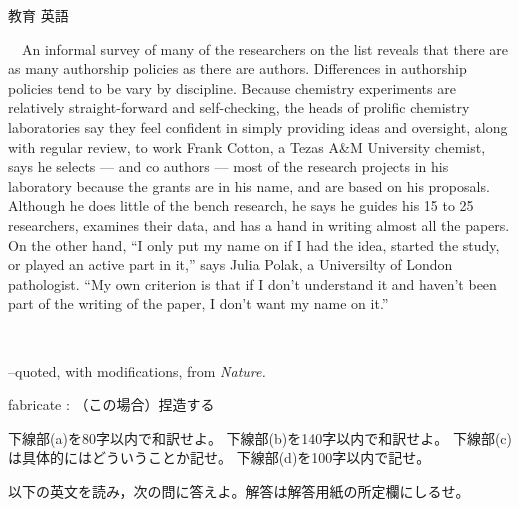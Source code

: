 \documentclass[fleqn]{jbook}
\begin{document}
\begin{question}{教育 英語}{}
\begin{subquestions}
   　An informal survey of many of the researchers on the list reveals
   that there are as many authorship policies as there are
   authors. Differences in authorship policies tend to be vary by
   discipline. Because chemistry experiments are relatively
   straight-forward and self-checking, the heads of prolific chemistry
   laboratories say they feel confident in simply providing ideas and
   oversight, along with regular review, to work
    Frank Cotton, a
   Tezas A\&M University chemist, says he selects --- and co
   authors --- most of the research projects in his laboratory because
   the grants are in his name, and are based on his
   proposals. Although he does little of the bench research, he says
   he guides his 15 to 25 researchers, examines their data, and has a
   hand in writing almost all the papers. On the other hand, ``I only
   put my name on if I had the idea, started the study, or played an
   active part in it,'' says Julia Polak, a Universilty of London
   pathologist. ``My own criterion is that if I don't understand it
   and haven't been part of the writing of the paper, I don't want my
   name on it.''

%
 \begin{flushright}
    --quoted, with modifications, from \em Nature. \em
 \end{flushright}

fabricate : （この場合）捏造する \\
\baselineskip=15pt

 \noindent{[設問]}
 \begin{subsubquestions}
 \SubSubQuestion
   下線部(a)を80字以内で和訳せよ。
 \SubSubQuestion
   下線部(b)を140字以内で和訳せよ。
 \SubSubQuestion
    下線部(c)は具体的にはどういうことか記せ。
 \SubSubQuestion
    下線部(d)を100字以内で記せ。
 \end{subsubquestions}





\SubQuestion
  
以下の英文を読み，次の問に答えよ。解答は解答用紙の所定欄にしるせ。
\baselineskip=12pt


\end{subquestions}
\end{question}
\end{document}
